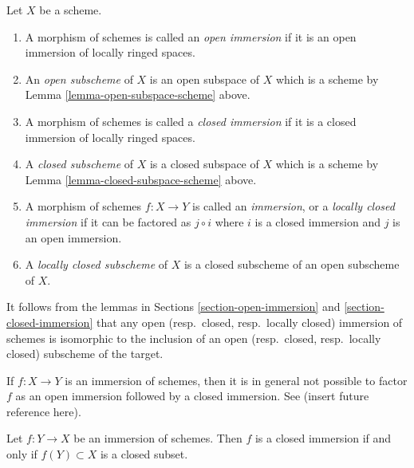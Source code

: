 \begin{definition}
\label{definition-immersion}
Let $X$ be a scheme.
\begin{enumerate}
\item A morphism of schemes is called an {\it open immersion}
if it is an open immersion of locally ringed spaces.
\item An {\it open subscheme} of $X$ is an open subspace of $X$
which is a scheme by Lemma \ref{lemma-open-subspace-scheme} above.
\item A morphism of schemes is called a {\it closed immersion}
if it is a closed immersion of locally ringed spaces.
\item A {\it closed subscheme} of $X$ is a closed subspace of $X$
which is a scheme by Lemma \ref{lemma-closed-subspace-scheme} above.
\item A morphism of schemes $f : X \to Y$ is called an {\it immersion},
or a {\it locally closed immersion} if it can be factored as
$j \circ i$ where $i$ is a closed immersion and $j$ is an open
immersion.
\item A {\it locally closed subscheme} of $X$ is a closed subscheme
of an open subscheme of $X$.
\end{enumerate}
\end{definition}

\noindent
It follows from the lemmas in Sections \ref{section-open-immersion}
and \ref{section-closed-immersion} that any open
(resp.\ closed, resp.\ locally closed) immersion of schemes
is isomorphic to the inclusion of an open
(resp.\ closed, resp.\ locally closed) subscheme of the target.

\begin{remark}
\label{remark-not-reverse-open-closed}
If $f : X \to Y$ is an immersion of schemes, then it is in general
not possible to factor $f$ as an open immersion followed
by a closed immersion. See (insert future reference here).
\end{remark}

\begin{lemma}
\label{lemma-immersion-when-closed}
Let $f : Y \to X$ be an immersion of schemes. Then $f$ is a closed
immersion if and only if $f(Y) \subset X$ is a closed subset.
\end{lemma}

